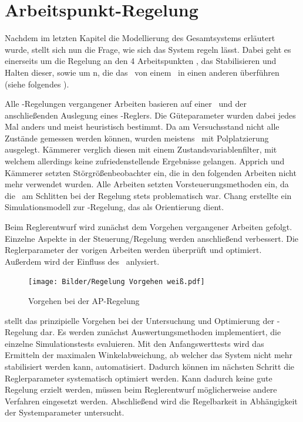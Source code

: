 \chapter{Arbeitspunkt-Regelung}\label{cha:apr}

Nachdem im letzten Kapitel die Modellierung des Gesamtsystems erläutert wurde, stellt sich nun die Frage, wie sich das System regeln lässt. Dabei geht es einerseits um die Regelung an den 4 Arbeitspunkten , \dah das Stabilisieren und Halten dieser, sowie um \traj n, die das \dpd\ von einem \ap\ in einen anderen überführen (siehe folgendes ).

Alle \ap -Regelungen vergangener Arbeiten basieren auf einer \lin\ und der anschließenden Auslegung eines \ricc-Reglers.
Die Güteparameter wurden dabei jedes Mal anders und meist heuristisch bestimmt.
Da am Versuchsstand nicht alle Zustände gemessen werden können, wurden meistens \beob\ mit Polplatzierung ausgelegt.
Kämmerer \cite{kämmerer} verglich diesen mit einem Zustandsvariablenfilter, mit welchem allerdings keine zufriedenstellende Ergebnisse gelangen.
Apprich \cite{apprich} und Kämmerer \cite{kämmerer} setzten Störgrößenbeobachter ein, die in den folgenden Arbeiten nicht mehr verwendet wurden.
Alle Arbeiten setzten Vorsteuerungsmethoden ein, da die \crb\ am Schlitten bei der Regelung stets problematisch war.
Chang \cite{chang} erstellte ein Simulationsmodell zur \ap-Regelung, das als Orientierung dient.

Beim Reglerentwurf wird zunächst dem Vorgehen vergangener Arbeiten gefolgt. 
Einzelne Aspekte in der Steuerung/Regelung werden anschließend verbessert.
Die Reglerparameter der vorigen Arbeiten werden überprüft und optimiert.
Außerdem wird der Einfluss des \beob\ anlysiert.

\begin{figure}[h]
	\centering
		\texttt{[image: Bilder/Regelung Vorgehen weiß.pdf]}
	\caption{Vorgehen bei der AP-Regelung }
	\label{fig:regvorg}
\end{figure}

 stellt das prinzipielle Vorgehen bei der Untersuchung und Optimierung der \ap-Regelung dar.
Es werden zunächst Auswertungsmethoden implementiert, die einzelne Simulationstests evaluieren.
Mit den Anfangswerttests wird das Ermitteln der maximalen Winkelabweichung, ab welcher das System nicht mehr stabilisiert werden kann, automatisiert.
Dadurch können im nächsten Schritt die Reglerparameter systematisch optimiert werden.
Kann dadurch keine gute Regelung erzielt werden, müssen beim Reglerentwurf möglicherweise andere Verfahren eingesetzt werden.
Abschließend wird die Regelbarkeit in Abhängigkeit der Systemparameter untersucht.

